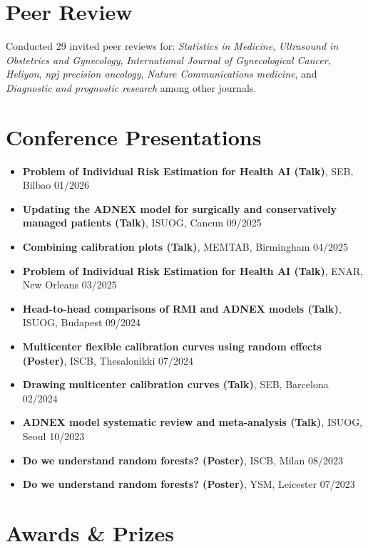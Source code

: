 \section*{Peer Review}

Conducted 29 invited peer reviews for: \textit{Statistics in Medicine}, \textit{Ultrasound in Obstetrics and Gynecology}, \textit{International Journal of Gynecological Cancer}, \textit{Heliyon}, \textit{npj precision oncology}, \textit{Nature Communications medicine}, and \textit{Diagnostic and prognostic research} among other journals.

\section*{Conference Presentations}

\begin{itemize}
    \item \textbf{Problem of Individual Risk Estimation for Health AI (Talk)}, SEB, Bilbao \hfill 01/2026
    \item \textbf{Updating the ADNEX model for surgically and conservatively managed patients (Talk)}, ISUOG, Cancun \hfill 09/2025
    \item \textbf{Combining calibration plots (Talk)}, MEMTAB, Birmingham \hfill 04/2025
    \item \textbf{Problem of Individual Risk Estimation for Health AI (Talk)}, ENAR, New Orleans \hfill 03/2025
    \item \textbf{Head-to-head comparisons of RMI and ADNEX models (Talk)}, ISUOG, Budapest \hfill 09/2024
    \item \textbf{Multicenter flexible calibration curves using random effects (Poster)}, ISCB, Thesalonikki \hfill 07/2024
    \item \textbf{Drawing multicenter calibration curves (Talk)}, SEB, Barcelona \hfill 02/2024
    \item \textbf{ADNEX model systematic review and meta-analysis (Talk)}, ISUOG, Seoul \hfill 10/2023
    \item \textbf{Do we understand random forests? (Poster)}, ISCB, Milan \hfill 08/2023
    \item \textbf{Do we understand random forests? (Poster)}, YSM, Leicester \hfill 07/2023
\end{itemize}

\section*{Awards \& Prizes}

